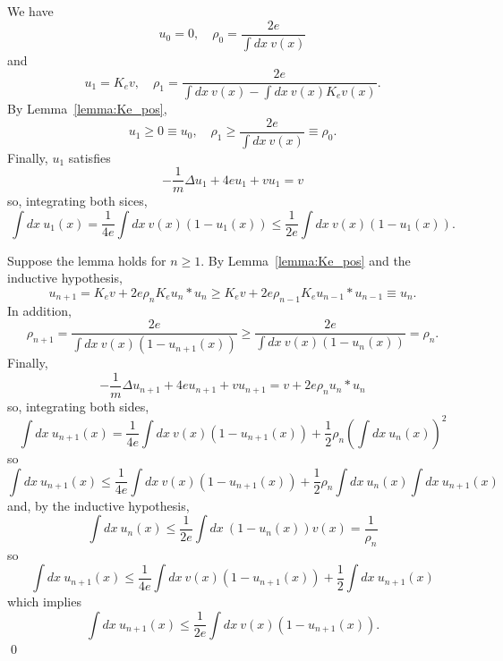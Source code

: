 \documentclass{ian}
\begin{document}
  \point
  We have
  \begin{equation}
    u_0=0
    ,\quad
    \rho_0=\frac{2e}{\int dx\ v(x)}
  \end{equation}
  and
  \begin{equation}
    u_1=K_ev
    ,\quad
    \rho_1=\frac{2e}{\int dx\ v(x)-\int dx\ v(x)K_ev(x)}
    .
  \end{equation}
  By Lemma\-~\ref{lemma:Ke_pos},
  \begin{equation}
    u_1\geqslant 0\equiv u_0
    ,\quad
    \rho_1\geqslant\frac{2e}{\int dx\ v(x)}\equiv \rho_0
    .
  \end{equation}
  Finally, $u_1$ satisfies
  \begin{equation}
    -\frac1m\Delta u_1+4e u_1+vu_1=v
  \end{equation}
  so, integrating both sices,
  \begin{equation}
    \int dx\ u_1(x)=\frac1{4e}\int dx\ v(x)(1-u_1(x))
    \leqslant\frac1{2e}\int dx\ v(x)(1-u_1(x))
    .
    \label{intu1}
  \end{equation}
  \bigskip

  \point
  Suppose the lemma holds for $n\geqslant 1$.
  By Lemma\-~\ref{lemma:Ke_pos} and the inductive hypothesis,
  \begin{equation}
    u_{n+1}=K_ev+2e\rho_nK_e u_n\ast u_n\geqslant
    K_ev+2e\rho_{n-1}K_e u_{n-1}\ast u_{n-1}
    \equiv u_n
    .
  \end{equation}
  In addition,
  \begin{equation}
    \rho_{n+1}=\frac{2e}{\int dx\ v(x)(1-u_{n+1}(x))}
    \geqslant\frac{2e}{\int dx\ v(x)(1-u_{n}(x))}=\rho_n
    .
  \end{equation}
  Finally,
  \begin{equation}
    -\frac1m\Delta u_{n+1}+4eu_{n+1}+v u_{n+1}=v+2e\rho_n u_n\ast u_n
  \end{equation}
  so, integrating both sides,
  \begin{equation}
    \int dx\ u_{n+1}(x)
    =\frac1{4e}\int dx\ v(x)(1-u_{n+1}(x))
    +\frac12\rho_n\left(\int dx\ u_n(x)\right)^2
    \label{intun}
  \end{equation}
  so
  \begin{equation}
    \int dx\ u_{n+1}(x)
    \leqslant\frac1{4e}\int dx\ v(x)(1-u_{n+1}(x))
    +\frac12\rho_n\int dx\ u_n(x)\int dx\ u_{n+1}(x)
  \end{equation}
  and, by the inductive hypothesis,
  \begin{equation}
    \int dx\ u_n(x)
    \leqslant
    \frac1{2e}\int dx\ (1-u_n(x))v(x)
    =\frac1{\rho_n}
  \end{equation}
  so
  \begin{equation}
    \int dx\ u_{n+1}(x)
    \leqslant\frac1{4e}\int dx\ v(x)(1-u_{n+1}(x))
    +\frac12\int dx\ u_{n+1}(x)
  \end{equation}
  which implies
  \begin{equation}
    \int dx\ u_{n+1}(x)
    \leqslant\frac1{2e}\int dx\ v(x)(1-u_{n+1}(x))
    .
  \end{equation}
\qed
\bigskip
\end{document}
